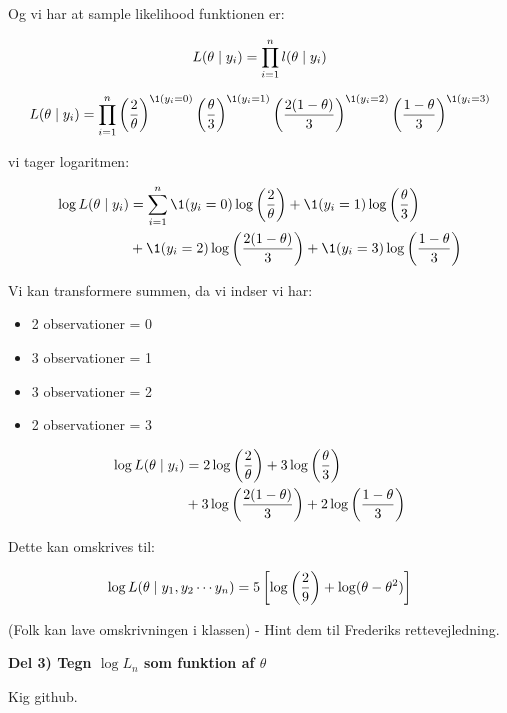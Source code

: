 Og vi har at sample likelihood funktionen er:

\begin{equation}
    L (\theta \mid y_i) = \prod_{i=1}^{n} l(\theta \mid y_i)
\end{equation}

\begin{equation}
    L (\theta \mid y_i) = \prodn \lp \frac{2}{\theta}\rp^{\1(y_i = 0)} \lp \frac{\theta}{3} \rp^{\1(y_i = 1)} \lp \frac{2(1-\theta)}{3} \rp^{\1(y_i = 2)} \lp  \frac{1- \theta}{3} \rp^{\1(y_i = 3)}
\end{equation}

vi tager logaritmen:

\begin{align}
    \log L(\theta \mid y_i) &=\sumn \1(y_i = 0) \log \lp \frac{2}{\theta}  \rp + \1(y_i = 1) \log \lp \frac{\theta}{3} \rp \\
    &+ \1(y_i = 2) \log \lp \frac{2(1-\theta)}{3} \rp +  \1(y_i = 3) \log \lp  \frac{1- \theta}{3} \rp
\end{align}

Vi kan transformere summen, da vi indser vi har:

\begin{itemize}
    \item 2 observationer = 0
    \item 3 observationer = 1
    \item 3 observationer = 2
    \item 2 observationer = 3
\end{itemize}

\begin{align}
    \log L(\theta \mid y_i) &=2 \log \left( \frac{2}{\theta}  \right) + 3 \log \left( \frac{\theta}{3} \right) \\
    &+ 3 \log \left( \frac{2(1-\theta)}{3} \right) +  2 \log \left(  \frac{1- \theta}{3} \right)
\end{align}

Dette kan omskrives til:

\begin{equation}
    \log L(\theta \mid y_1, y_2 \cdots y_n) = 5 \left[ \log \left( \frac{2}{9}\right)  + \log(\theta - \theta^2) \right]
\end{equation}

(Folk kan lave omskrivningen i klassen) - Hint dem til Frederiks rettevejledning.


\textbf{Del 3) Tegn $\log L_n$ som funktion af $\theta$}

Kig github.

